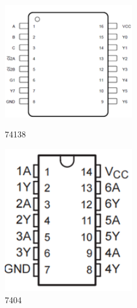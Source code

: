 \documentclass{ctexart}
\begin{document}
\begin{figure}[H]
    \centering
    \begin{minipage}{0.5\textwidth}
    \centering
           \includegraphics[width=0.5\textwidth]{74138.png}
           \caption{74138}
    \label{}
    \end{minipage}
    \hspace{0.05\textwidth}
    \begin{minipage}{0.4\textwidth}
    \centering
           \includegraphics[width=0.5\textwidth]{7404.png}
           \caption{7404}
    \label{7474}
    \end{minipage}
\end{figure}
\end{document}
